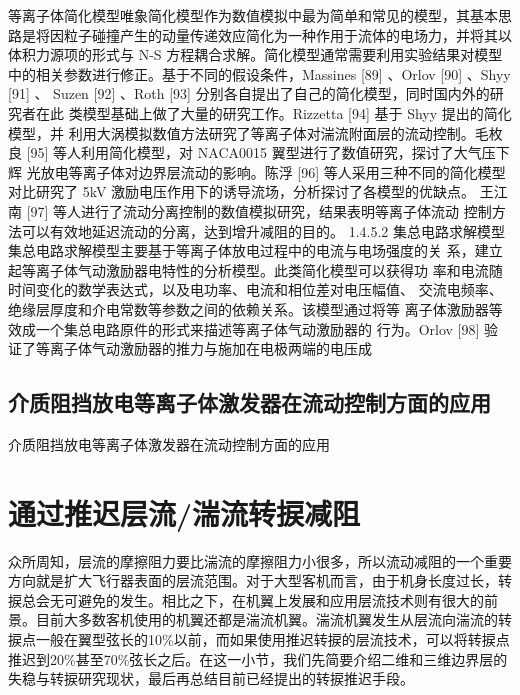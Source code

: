 等离子体简化模型唯象简化模型作为数值模拟中最为简单和常见的模型，其基本思路是将因粒子碰撞产生的动量传递效应简化为一种作用于流体的电场力，并将其以体积力源项的形式与 N-S 方程耦合求解。简化模型通常需要利用实验结果对模型中的相关参数进行修正。基于不同的假设条件，Massines
[89]
、Orlov
[90]
、Shyy
[91]
、
Suzen
[92]
、Roth
[93]
分别各自提出了自己的简化模型，同时国内外的研究者在此
类模型基础上做了大量的研究工作。Rizzetta
[94]
基于 Shyy 提出的简化模型，并
利用大涡模拟数值方法研究了等离子体对湍流附面层的流动控制。毛枚良
[95]
等人利用简化模型，对 NACA0015 翼型进行了数值研究，探讨了大气压下辉
光放电等离子体对边界层流动的影响。陈浮
[96]
等人采用三种不同的简化模型
对比研究了 5kV 激励电压作用下的诱导流场，分析探讨了各模型的优缺点。
王江南
[97]
等人进行了流动分离控制的数值模拟研究，结果表明等离子体流动
控制方法可以有效地延迟流动的分离，达到增升减阻的目的。
1.4.5.2 集总电路求解模型
集总电路求解模型主要基于等离子体放电过程中的电流与电场强度的关
系，建立起等离子体气动激励器电特性的分析模型。此类简化模型可以获得功
率和电流随时间变化的数学表达式，以及电功率、电流和相位差对电压幅值、
交流电频率、绝缘层厚度和介电常数等参数之间的依赖关系。该模型通过将等
离子体激励器等效成一个集总电路原件的形式来描述等离子体气动激励器的
行为。Orlov
[98]
验证了等离子体气动激励器的推力与施加在电极两端的电压成

\subsection{介质阻挡放电等离子体激发器在流动控制方面的应用}
介质阻挡放电等离子体激发器在流动控制方面的应用
\section{通过推迟层流/湍流转捩减阻}
\label{sec:first}
众所周知，层流的摩擦阻力要比湍流的摩擦阻力小很多，所以流动减阻的一个重要方向就是扩大飞行器表面的层流范围。对于大型客机而言，由于机身长度过长，转捩总会无可避免的发生。相比之下，在机翼上发展和应用层流技术则有很大的前景。目前大多数客机使用的机翼还都是湍流机翼。湍流机翼发生从层流向湍流的转捩点一般在翼型弦长的10\%以前，而如果使用推迟转捩的层流技术，可以将转捩点推迟到20\%甚至70\%弦长之后。在这一小节，我们先简要介绍二维和三维边界层的失稳与转捩研究现状，最后再总结目前已经提出的转捩推迟手段。

